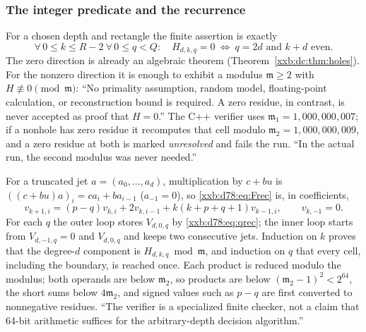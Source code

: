 \documentclass[11pt,a4paper]{article}
\numberwithin{equation}{section}
\theoremstyle{definition}
\theoremstyle{remark}
\theoremstyle{plain}
\begin{document}
\subsubsection{The integer predicate and the recurrence}

For a chosen depth and rectangle the finite assertion is exactly
\begin{equation}\label{xxb:d78:eq:finitepredicate}
 \forall\,0\le k\le R-2\ \forall\,0\le q<Q:\quad
 H_{d,k,q}=0\ \Longleftrightarrow\ q=2d\text{ and }k+d\text{ even}.
\end{equation}
The zero direction is already an algebraic theorem
(Theorem~\ref{xxb:dc:thm:holes}).  For the nonzero direction it is enough to
exhibit a modulus $\mathfrak m\ge2$ with $H\not\equiv0\pmod{\mathfrak m}$:
``No primality assumption, random model, floating-point calculation, or
reconstruction bound is required. A zero residue, in contrast, is never
accepted as proof that $H=0$.''  The C++ verifier uses
$\mathfrak m_1=1{,}000{,}000{,}007$; if a nonhole has zero residue it
recomputes that cell modulo $\mathfrak m_2=1{,}000{,}000{,}009$, and a zero
residue at both is marked \emph{unresolved} and fails the run.  ``In the
actual run, the second modulus was never needed.''

For a truncated jet $a=(a_0,\ldots,a_d)$, multiplication by $c+bu$ is
$((c+bu)a)_i=ca_i+ba_{i-1}$ ($a_{-1}=0$), so \eqref{xxb:d78:eq:Frec} is, in
coefficients,
\begin{equation}\label{xxb:d78:eq:jetrec}
 v_{k+1,i}=(p-q)v_{k,i}+2v_{k,i-1}+k(k+p+q+1)v_{k-1,i},\qquad v_{k,-1}=0.
\end{equation}
For each $q$ the outer loop stores $V_{d,0,q}$ by \eqref{xxb:d78:eq:qrec}; the
inner loop starts from $V_{d,-1,q}=0$ and $V_{d,0,q}$ and keeps two
consecutive jets.  Induction on $k$ proves that the degree-$d$ component is
$H_{d,k,q}\bmod\mathfrak m$, and induction on $q$ that every cell, including
the boundary, is reached once.  Each product is reduced modulo the modulus;
both operands are below $\mathfrak m_2$, so products are below
$(\mathfrak m_2-1)^2<2^{64}$, the short sums below $4\mathfrak m_2$, and signed
values such as $p-q$ are first converted to nonnegative residues.  ``The
verifier is a specialized finite checker, not a claim that 64-bit arithmetic
suffices for the arbitrary-depth decision algorithm.''
\end{document}
